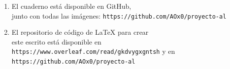 \begin{enumerate}
\item El cuaderno está disponible en GitHub,\\ junto con todas las imágenes:
\texttt{https://github.com/AOx0/proyecto-al}
\item El repositorio de código de LaTeX para crear\\ este escrito está
disponible en\\  \texttt{https://www.overleaf.com/read/gkdvygxgntsh} y en
\texttt{https://github.com/AOx0/proyecto-al}
\end{enumerate}

